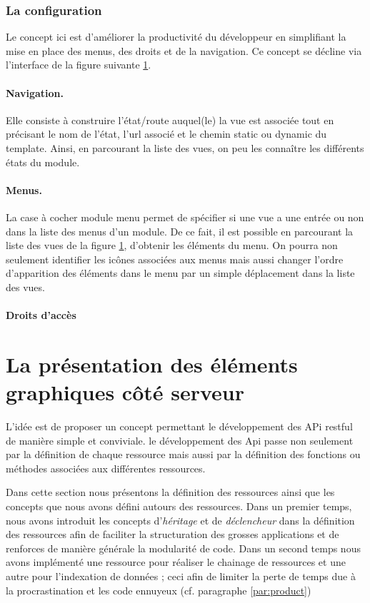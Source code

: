 \documentclass[a4paper,11pt]{report}
\begin{document}
 

\subsubsection{ La configuration} 
Le  concept ici est d'améliorer la productivité du développeur en
simplifiant la mise en place des menus, des droits et de la navigation.
Ce concept se décline via l'interface de la figure suivante \ref{}.

\paragraph{Navigation.}
Elle consiste à construire l'état/route auquel(le) la vue est associée
tout en précisant le nom de l'état, l'url associé et le chemin static
ou dynamic du template. Ainsi, en parcourant la liste des vues, on peu
les connaître les différents états du module.
 
\paragraph{Menus.}
La case à cocher \og module menu \fg permet de spécifier si une vue
a une entrée ou non dans la liste des menus d'un module.  De ce fait,
il est possible en parcourant la liste des vues de la figure \ref{},
d'obtenir les éléments du menu. On pourra non seulement identifier
les icônes associées aux menus mais aussi changer l'ordre d'apparition
des éléments dans le menu par un simple déplacement dans la liste des vues.
 
\paragraph{Droits d'accès}

\section{La présentation des éléments graphiques côté serveur}


L'idée est de proposer un concept permettant le développement des APi
restful de manière simple et conviviale. le développement des Api passe non
seulement par la définition de chaque ressource mais aussi par la définition
des fonctions ou méthodes associées aux différentes ressources.

Dans cette section nous présentons la définition des ressources ainsi
que les concepts que nous avons défini autours des ressources. Dans un
premier temps, nous avons introduit les concepts d'{\em héritage} et
de {\em déclencheur} dans la définition des ressources afin de
faciliter la structuration des grosses applications et de renforces de
manière générale la modularité de code. Dans un second temps nous
avons implémenté une ressource pour réaliser le chainage de ressources
et une autre pour l'indexation de données ; ceci afin de limiter la
perte de temps due à la procrastination et les code ennuyeux
(cf. paragraphe \ref{par:product})
\end{document}
